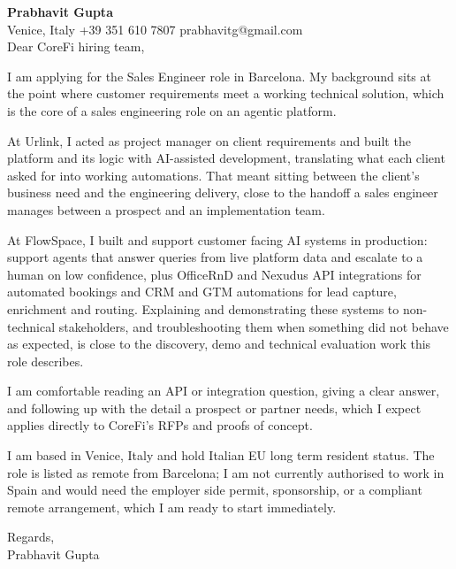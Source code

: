 \documentclass[a4paper,10.5pt]{article}
\begin{document}
\textbf{Prabhavit Gupta}\\
Venice, Italy \textbar{} +39 351 610 7807 \textbar{} prabhavitg@gmail.com\\[10pt]
Dear CoreFi hiring team,

I am applying for the Sales Engineer role in Barcelona. My background sits at the point where customer requirements meet a working technical solution, which is the core of a sales engineering role on an agentic platform.

At Urlink, I acted as project manager on client requirements and built the platform and its logic with AI-assisted development, translating what each client asked for into working automations. That meant sitting between the client's business need and the engineering delivery, close to the handoff a sales engineer manages between a prospect and an implementation team.

At FlowSpace, I built and support customer facing AI systems in production: support agents that answer queries from live platform data and escalate to a human on low confidence, plus OfficeRnD and Nexudus API integrations for automated bookings and CRM and GTM automations for lead capture, enrichment and routing. Explaining and demonstrating these systems to non-technical stakeholders, and troubleshooting them when something did not behave as expected, is close to the discovery, demo and technical evaluation work this role describes.

I am comfortable reading an API or integration question, giving a clear answer, and following up with the detail a prospect or partner needs, which I expect applies directly to CoreFi's RFPs and proofs of concept.

I am based in Venice, Italy and hold Italian EU long term resident status. The role is listed as remote from Barcelona; I am not currently authorised to work in Spain and would need the employer side permit, sponsorship, or a compliant remote arrangement, which I am ready to start immediately.

Regards,\\
Prabhavit Gupta
\end{document}
